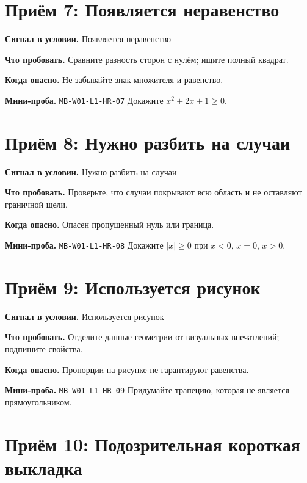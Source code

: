 \documentclass[11pt,a4paper,openany]{book}
\newcommand{\muid}[1]{\texttt{\footnotesize #1}}
\begin{document}
\section{Приём 7: Появляется неравенство}

\begin{keybox}\textbf{Сигнал в условии.} Появляется неравенство\par \textbf{Что пробовать.} Сравните разность сторон с нулём; ищите полный квадрат.\end{keybox}

\textbf{Когда опасно.} Не забывайте знак множителя и равенство.\par \textbf{Мини-проба.} \muid{MB-W01-L1-HR-07} Докажите $x^2+2x+1\ge0$.


\section{Приём 8: Нужно разбить на случаи}

\begin{keybox}\textbf{Сигнал в условии.} Нужно разбить на случаи\par \textbf{Что пробовать.} Проверьте, что случаи покрывают всю область и не оставляют граничной щели.\end{keybox}

\textbf{Когда опасно.} Опасен пропущенный нуль или граница.\par \textbf{Мини-проба.} \muid{MB-W01-L1-HR-08} Докажите $|x|\ge0$ при $x<0$, $x=0$, $x>0$.


\section{Приём 9: Используется рисунок}

\begin{keybox}\textbf{Сигнал в условии.} Используется рисунок\par \textbf{Что пробовать.} Отделите данные геометрии от визуальных впечатлений; подпишите свойства.\end{keybox}

\textbf{Когда опасно.} Пропорции на рисунке не гарантируют равенства.\par \textbf{Мини-проба.} \muid{MB-W01-L1-HR-09} Придумайте трапецию, которая не является прямоугольником.


\section{Приём 10: Подозрительная короткая выкладка}
\end{document}
